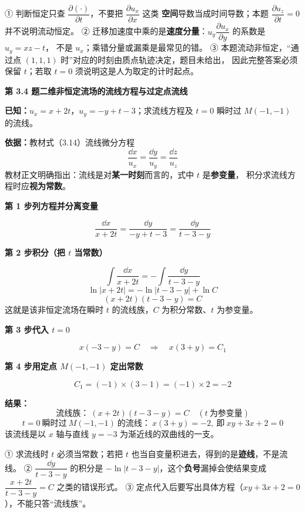 \begin{yicuo}
① 判断恒定只查 $\dfrac{\partial(\cdot)}{\partial t}$，不要把 $\dfrac{\partial u_x}{\partial x}$ 这类
\textbf{空间}导数当成时间导数；本题 $\dfrac{\partial u_z}{\partial t}=0$ 并不说明流动恒定。
② 迁移加速度中乘的是\textbf{速度分量}：$u_y\dfrac{\partial u_x}{\partial y}$ 的系数是 $u_y=xz-t$，
不是 $u_x$；乘错分量或漏乘是最常见的错。
③ 本题流动非恒定，“通过点 $(1,1,1)$ 时”对应的时刻由质点轨迹决定，题目未给出，
因此完整答案必须保留 $t$；若取 $t=0$ 须说明这是人为取定的计时起点。
\end{yicuo}

\noindent\textbf{第 3.4 题\quad 二维非恒定流场的流线方程与过定点流线}

\begin{jie}
\textbf{已知：}$u_x=x+2t$，$u_y=-y+t-3$；求流线方程及 $t=0$ 瞬时过 $M(-1,-1)$ 的流线。

\textbf{依据：}教材式（3.14）流线微分方程
\[ \frac{\dd x}{u_x}=\frac{\dd y}{u_y}=\frac{\dd z}{u_z} \]
教材正文明确指出：流线是对\textbf{某一时刻}而言的，式中 $t$ 是\textbf{参变量}，
积分求流线方程时应\textbf{视为常数}。

\textbf{第 1 步\quad 列方程并分离变量}

\[ \frac{\dd x}{x+2t}=\frac{\dd y}{-y+t-3}=\frac{\dd y}{t-3-y} \]

\textbf{第 2 步\quad 积分（把 $t$ 当常数）}

\[ \int\frac{\dd x}{x+2t}=-\int\frac{\dd y}{t-3-y} \]
\[ \ln|x+2t|=-\ln|t-3-y|+\ln C \]
\[ \boxed{(x+2t)(t-3-y)=C} \]
这就是该非恒定流场在瞬时 $t$ 的流线族，$C$ 为积分常数、$t$ 为参变量。

\textbf{第 3 步\quad 代入 $t=0$}

\[ x(-3-y)=C \quad\Longrightarrow\quad x(3+y)=C_1 \]

\textbf{第 4 步\quad 用定点 $M(-1,-1)$ 定出常数}

\[ C_1=(-1)\times(3-1)=(-1)\times2=-2 \]

\textbf{结果：}
\[ \text{流线族：}\ (x+2t)(t-3-y)=C\quad(t\ \text{为参变量}) \]
\[ t=0\ \text{瞬时过}\ M(-1,-1)\ \text{的流线：}\ x(3+y)=-2,\ \text{即}\ xy+3x+2=0 \]
该流线是以 $x$ 轴与直线 $y=-3$ 为渐近线的双曲线的一支。
\end{jie}

\begin{yicuo}
① 求流线时 $t$ 必须当常数；若把 $t$ 也当自变量积进去，得到的是\textbf{迹线}，不是流线。
② $\dfrac{\dd y}{t-3-y}$ 的积分是 $-\ln|t-3-y|$，这个\textbf{负号}漏掉会使结果变成
$\dfrac{x+2t}{t-3-y}=C$ 之类的错误形式。
③ 定点代入后要写出具体方程（$xy+3x+2=0$），不能只答“流线族”。
\end{yicuo}

